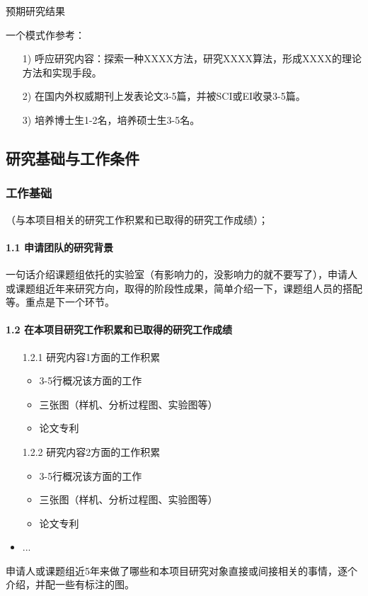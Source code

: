 预期研究结果

一个模式作参考：
\begin{itemize}
\item[1)] 呼应研究内容：探索一种XXXX方法，研究XXXX算法，形成XXXX的理论方法和实现手段。

\item[2)] 在国内外权威期刊上发表论文3-5篇，并被SCI或EI收录3-5篇。

\item[3)] 培养博士生1-2名，培养硕士生3-5名。
\end{itemize}



\subsection{研究基础与工作条件}
\subsubsection{工作基础}
（与本项目相关的研究工作积累和已取得的研究工作成绩）；
\paragraph{1.1 申请团队的研究背景}
一句话介绍课题组依托的实验室（有影响力的，没影响力的就不要写了），申请人或课题组近年来研究方向，取得的阶段性成果，简单介绍一下，课题组人员的搭配等。重点是下一个环节。

\paragraph{1.2 在本项目研究工作积累和已取得的研究工作成绩}
\begin{itemize}
\item[1.2.1] 研究内容1方面的工作积累
	\begin{itemize}
	\item 3-5行概况该方面的工作
	\item 三张图（样机、分析过程图、实验图等）
	\item 论文专利
	\end{itemize}
	
\item[1.2.2] 研究内容2方面的工作积累
	\begin{itemize}
	\item 3-5行概况该方面的工作
	\item 三张图（样机、分析过程图、实验图等）
	\item 论文专利
	\end{itemize}
	
\item ...
\end{itemize}
申请人或课题组近5年来做了哪些和本项目研究对象直接或间接相关的事情，逐个介绍，并配一些有标注的图。


